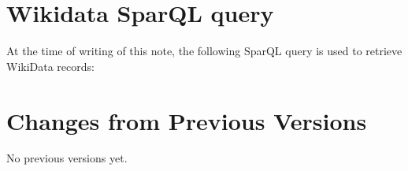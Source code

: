 \documentclass[11pt,a4paper]{ivoa}
\begin{document}
\section{Wikidata SparQL query}
\label{appendix:sparql}
At the time of writing of this note, the following SparQL query
is used to retrieve WikiData records:  
{\tiny{}}


\section{Changes from Previous Versions}

No previous versions yet.  



\end{document}
